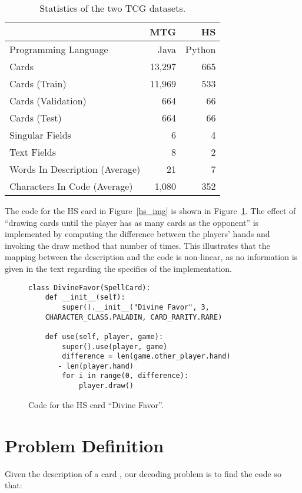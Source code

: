 \documentclass[11pt]{article}
\begin{document}
\begin{table}
\centering
\small
\begin{tabular}{@{}lrr@{}}
\toprule
{\bf } & {\bf MTG} & {\bf HS}\\
\midrule
Programming Language & Java & Python\\
\midrule
Cards & 13,297 & 665 \\
Cards (Train) & 11,969 & 533 \\
Cards (Validation) & 664 & 66 \\
Cards (Test) & 664 & 66 \\
\midrule
Singular Fields & 6 & 4 \\
Text Fields & 8 & 2 \\
\midrule
Words In Description (Average) & 21 & 7 \\
Characters In Code (Average) & 1,080 & 352 \\
\bottomrule
\end{tabular}
\caption{Statistics of the two TCG datasets.}\label{tab:corpus}
\end{table}


The code for the HS card in Figure~\ref{hs_img} is shown in Figure~\ref{df_code}. The effect of ``drawing cards until the player has as many cards as the
opponent'' is implemented by computing the difference between the players' hands
and invoking the draw method that number of times. This illustrates that
the mapping between the description and the code is non-linear, as no information is given in the text regarding the specifics of the implementation.



\begin{figure}[ht!]
\begin{center}
\begin{lstlisting}
class DivineFavor(SpellCard):
    def __init__(self):
        super().__init__("Divine Favor", 3,
    CHARACTER_CLASS.PALADIN, CARD_RARITY.RARE)

    def use(self, player, game):
        super().use(player, game)
        difference = len(game.other_player.hand)
       - len(player.hand)
        for i in range(0, difference):
            player.draw()
\end{lstlisting}
\end{center}
\caption{Code for the HS card ``Divine Favor''.}
\label{df_code}
\end{figure}

\section{Problem Definition}
\label{problem}
Given the description of a card , our decoding problem is to find the code  so that:
\end{document}
